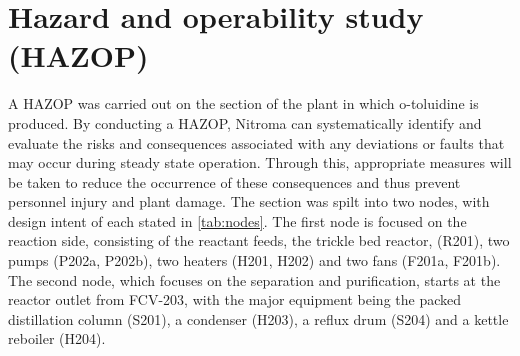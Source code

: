 \section{Hazard and operability study (HAZOP) }
 
A HAZOP was carried out on the section of the plant in which o-toluidine is produced. By conducting a HAZOP, Nitroma can systematically identify and evaluate the risks and consequences associated with any deviations or faults that may occur during steady state operation. Through this, appropriate measures will be taken to reduce the occurrence of these consequences and thus prevent personnel injury and plant damage. The section was spilt into two nodes, with design intent of each stated in \cref{tab:nodes}. The first node is focused on the reaction side, consisting of the reactant feeds, the trickle bed reactor, (R201), two pumps (P202a, P202b), two heaters (H201, H202) and two fans (F201a, F201b). The second node, which focuses on the separation and purification, starts at the reactor outlet from FCV-203, with the major equipment being the packed distillation column (S201), a condenser (H203), a reflux drum (S204) and a kettle reboiler (H204). 


 

